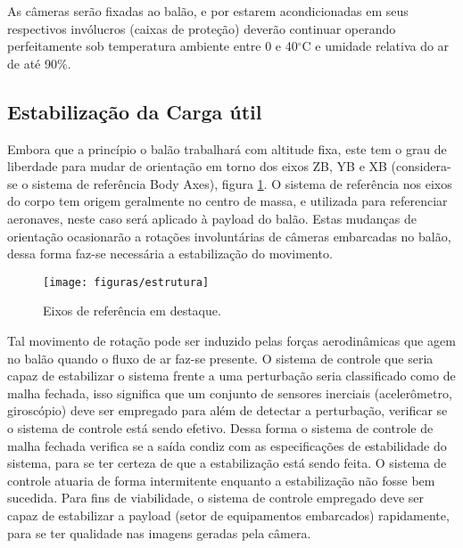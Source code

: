 As câmeras serão fixadas ao balão, e por estarem acondicionadas em seus respectivos invólucros (caixas de proteção) deverão continuar operando perfeitamente sob temperatura ambiente
entre 0 e 40$^{\circ}$C e umidade relativa do ar de até 90\%.

\subsection{Estabilização da Carga útil}

Embora que a princípio o balão trabalhará com altitude fixa, este tem o grau de liberdade para mudar de orientação em torno dos eixos ZB, YB e XB (considera-se o sistema de referência Body Axes), figura \ref{img:eixosreferencia}. O sistema de referência nos eixos do corpo tem origem geralmente no centro de massa, e utilizada para referenciar aeronaves, neste caso será aplicado à payload do balão. Estas mudanças de orientação ocasionarão a rotações involuntárias de câmeras embarcadas no balão, dessa forma faz-se necessária a estabilização do movimento.

\begin{figure}[H]
  \centering
  \caption{Eixos de referência em destaque.}
  \label{img:eixosreferencia}
  \texttt{[image: figuras/estrutura]}
\end{figure}

Tal movimento de rotação pode ser induzido pelas forças aerodinâmicas que agem no balão quando o fluxo de ar faz-se presente. O sistema de controle que seria capaz de estabilizar o sistema frente a uma perturbação seria classificado como de malha fechada, isso significa que um conjunto de sensores inerciais (acelerômetro, giroscópio) deve ser empregado para além de detectar a perturbação, verificar se o sistema de controle está sendo efetivo. Dessa forma o sistema de controle de malha fechada verifica se a saída condiz com as especificações de estabilidade do sistema, para se ter certeza de que a estabilização está sendo feita. O sistema de controle atuaria de forma intermitente enquanto a estabilização não fosse bem sucedida. Para fins de viabilidade, o sistema de controle empregado deve ser capaz de estabilizar a payload (setor de equipamentos embarcados) rapidamente, para se ter qualidade nas imagens geradas pela câmera.

